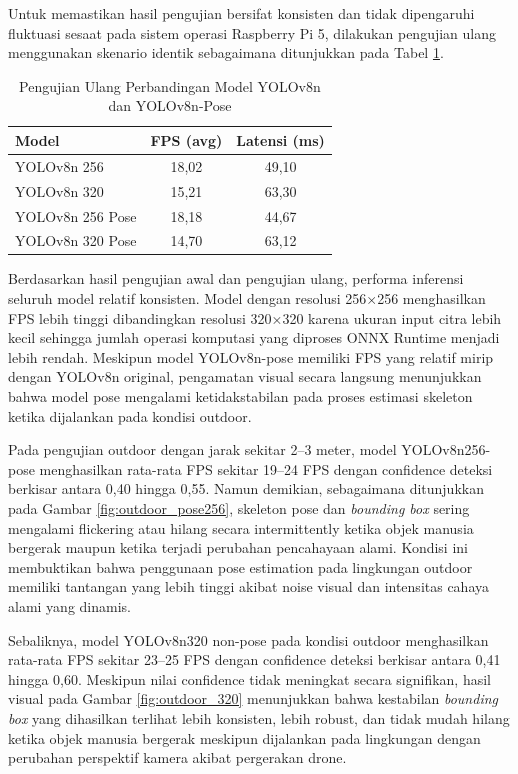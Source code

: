 Untuk memastikan hasil pengujian bersifat konsisten dan tidak dipengaruhi fluktuasi sesaat pada sistem operasi Raspberry Pi 5, dilakukan pengujian ulang menggunakan skenario identik sebagaimana ditunjukkan pada Tabel \ref{tab:model_compare_awal2}.

\begin{table}[H]
	\centering
	\caption{Pengujian Ulang Perbandingan Model YOLOv8n dan YOLOv8n-Pose}
	\label{tab:model_compare_awal2}
	\renewcommand{\arraystretch}{1.2}
	\begin{tabular}{|p{5cm}|c|c|}
		\hline
		Model & FPS (avg) & Latensi (ms) \\ \hline
		
		YOLOv8n 256 &
		18,02 &
		49,10 \\ \hline
		
		YOLOv8n 320 &
		15,21 &
		63,30 \\ \hline
		
		YOLOv8n 256 Pose &
		18,18 &
		44,67 \\ \hline
		
		YOLOv8n 320 Pose &
		14,70 &
		63,12 \\ \hline
	\end{tabular}
\end{table}

Berdasarkan hasil pengujian awal dan pengujian ulang, performa inferensi seluruh model relatif konsisten.
Model dengan resolusi 256×256 menghasilkan FPS lebih tinggi dibandingkan resolusi 320×320 karena ukuran input citra lebih kecil sehingga jumlah operasi komputasi yang diproses ONNX Runtime menjadi lebih rendah.
Meskipun model YOLOv8n-pose memiliki FPS yang relatif mirip dengan YOLOv8n original, pengamatan visual secara langsung menunjukkan bahwa model pose mengalami ketidakstabilan pada proses estimasi skeleton ketika dijalankan pada kondisi outdoor.

Pada pengujian outdoor dengan jarak sekitar 2--3 meter, model YOLOv8n256-pose menghasilkan rata-rata FPS sekitar 19--24 FPS dengan confidence deteksi berkisar antara 0,40 hingga 0,55. Namun demikian, sebagaimana ditunjukkan pada Gambar \ref{fig:outdoor_pose256}, skeleton pose dan \textit{bounding box} sering mengalami flickering atau hilang secara intermittently ketika objek manusia bergerak maupun ketika terjadi perubahan pencahayaan alami. Kondisi ini membuktikan bahwa penggunaan pose estimation pada lingkungan outdoor memiliki tantangan yang lebih tinggi akibat noise visual dan intensitas cahaya alami yang dinamis.

Sebaliknya, model YOLOv8n320 non-pose pada kondisi outdoor menghasilkan rata-rata FPS sekitar 23--25 FPS dengan confidence deteksi berkisar antara 0,41 hingga 0,60. Meskipun nilai confidence tidak meningkat secara signifikan, hasil visual pada Gambar \ref{fig:outdoor_320} menunjukkan bahwa kestabilan \textit{bounding box} yang dihasilkan terlihat lebih konsisten, lebih robust, dan tidak mudah hilang ketika objek manusia bergerak meskipun dijalankan pada lingkungan dengan perubahan perspektif kamera akibat pergerakan drone.

